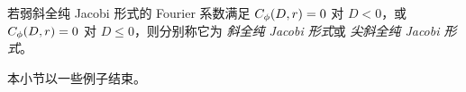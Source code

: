 
若弱斜全纯 Jacobi 形式的 Fourier 系数满足 $C_\phi(D,r)=0$ 对 $D < 0$，或 $C_{\phi}(D,r)=0$ 对 $D \le0$，则分别称它为 {\em 斜全纯 Jacobi 形式}或 {\em 尖斜全纯 Jacobi 形式}。


本小节以一些例子结束。
